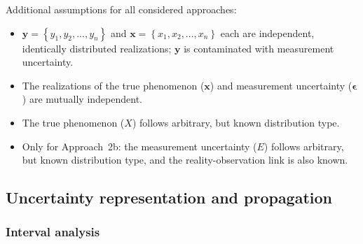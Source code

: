 \noindent Additional assumptions for all considered approaches:
\begin{itemize}
	\item ${\mathbf{y}} = \left\{ {{y_1},{y_2},...,{y_n}} \right\}$ and ${\mathbf{x}} = \left\{ {{x_1},{x_2},...,{x_n}} \right\}$ each are independent, identically distributed realizations; $\mathbf{y}$ is contaminated with measurement uncertainty.
	\item The realizations of the true phenomenon ($\mathbf{x}$) and measurement uncertainty ($\boldsymbol{\epsilon}$) are mutually independent.
	\item The true phenomenon ($X$) follows arbitrary, but known distribution type.
	\item Only for Approach~2b: the measurement uncertainty ($E$) follows arbitrary, but known distribution type, and the reality-observation link is also known.
\end{itemize}


\subsection{Uncertainty representation and propagation}
\label{sec:uncertainty_rep_prop}

\subsubsection{Interval analysis}

